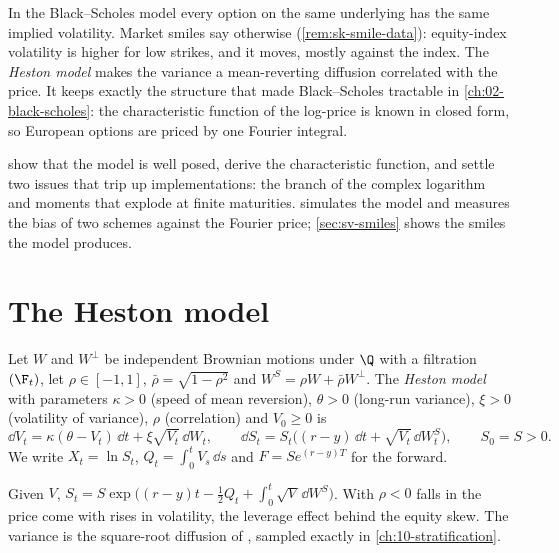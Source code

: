 \providecommand{\Log}{\operatorname{Log}}
\providecommand{\Arg}{\operatorname{Arg}}

In the Black--Scholes model every option on the same underlying has the same implied volatility. Market
smiles say otherwise (\cref{rem:sk-smile-data}): equity-index volatility is higher for low strikes, and it
moves, mostly against the index. The \emph{Heston model} makes the variance a mean-reverting diffusion
correlated with the price. It keeps exactly the structure that made Black--Scholes tractable in
\cref{ch:02-black-scholes}: the characteristic function of the log-price is known in closed form, so
European options are priced by one Fourier integral.

 show that the model is well posed, derive the characteristic
function, and settle two issues that trip up implementations: the branch of the complex logarithm and moments
that explode at finite maturities.  simulates the model and measures the bias of two
schemes against the Fourier price; \cref{sec:sv-smiles} shows the smiles the model produces.

\section{The Heston model}\label{sec:sv-model}

\begin{definition}\label{def:sv-heston}
Let $W$ and $W^\perp$ be independent Brownian motions under $\Q$ with a filtration $(\F_t)$, let
$\rho\in[-1,1]$, $\bar\rho=\sqrt{1-\rho^2}$ and $W^S=\rho W+\bar\rho W^\perp$. The \emph{Heston model} with
parameters $\kappa>0$ (speed of mean reversion), $\theta>0$ (long-run variance), $\xi>0$ (volatility of
variance), $\rho$ (correlation) and $V_0\ge0$ is
\begin{equation}\label{eq:sv-heston}
  \dd V_t=\kappa(\theta-V_t)\,\dd t+\xi\sqrt{V_t}\,\dd W_t,\qquad
  \dd S_t=S_t\big((r-y)\,\dd t+\sqrt{V_t}\,\dd W^S_t\big),\qquad S_0=S>0 .
\end{equation}
We write $X_t=\ln S_t$, $Q_t=\int_0^tV_s\,\dd s$ and $F=Se^{(r-y)T}$ for the forward.
\end{definition}

Given $V$, $S_t=S\exp\big((r-y)t-\frac12Q_t+\int_0^t\sqrt V\,\dd W^S\big)$. With $\rho<0$ falls in the price come
with rises in volatility, the leverage effect behind the equity skew. The variance is the square-root
diffusion of \textcite{cox-ingersoll-ross}, sampled exactly in \cref{ch:10-stratification}.

